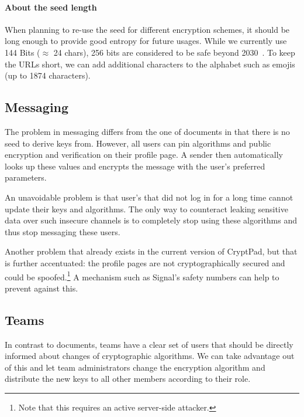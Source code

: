 \documentclass[a4paper, 11pt]{article}
\begin{document}
\paragraph{About the seed length}
When planning to re-use the seed for different encryption schemes, it should be long enough to provide good entropy for future usages.
While we currently use 144 Bits ($\approx$ 24 chars), 256 bits are considered to be safe beyond 2030~\cite{Giry2020}.
To keep the URLs short, we can add additional characters to the alphabet such as emojis (up to 1874 characters).

\subsection{Messaging}
\label{sec:messaging}

The problem in messaging differs from the one of documents in that there is no seed to derive keys from.
However, all users can pin algorithms and public encryption and verification on their profile page.
A sender then automatically looks up these values and encrypts the message with the user's preferred parameters.

An unavoidable problem is that user's that did not log in for a long time cannot update their keys and algorithms.
The only way to counteract leaking sensitive data over such insecure channels is to completely stop using these algorithms and thus stop messaging these users.

Another problem that already exists in the current version of CryptPad, but that is further accentuated:
the profile pages are not cryptographically secured and could be spoofed.\footnote{Note that this requires an active server-side attacker.}
A mechanism such as Signal's safety numbers can help to prevent against this.

\subsection{Teams}
\label{sec:teams}

In contrast to documents, teams have a clear set of users that should be directly informed about changes of cryptographic algorithms.
We can take advantage out of this and let team administrators change the encryption algorithm and distribute the new keys to all other members according to their role.

\printbibliography

\appendix

\end{document}

